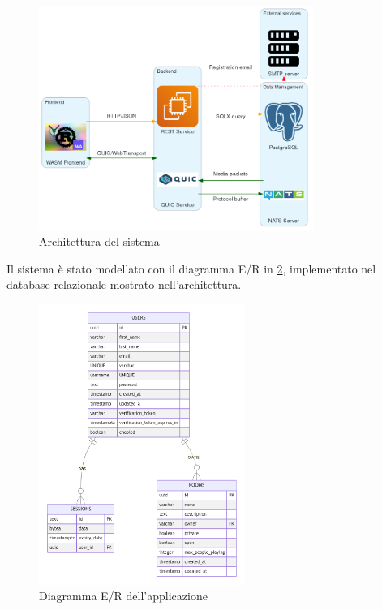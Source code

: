 \documentclass{article}
\begin{document}
\begin{figure}[h]
  \begin{center}
    \includegraphics[width=0.8\textwidth]{figures/architecture_cropped.png}
  \end{center}
  \caption{Architettura del sistema}\label{fig:architecture}
\end{figure}

Il sistema è stato modellato con il diagramma E/R in \cref{fig:er}, implementato nel database 
relazionale mostrato nell'architettura. 

\begin{figure}[h]
  \begin{center}
    \includegraphics[width=0.6\textwidth]{figures/er.png}
  \end{center}
  \caption{Diagramma E/R dell'applicazione}\label{fig:er}
\end{figure}
\end{document}
